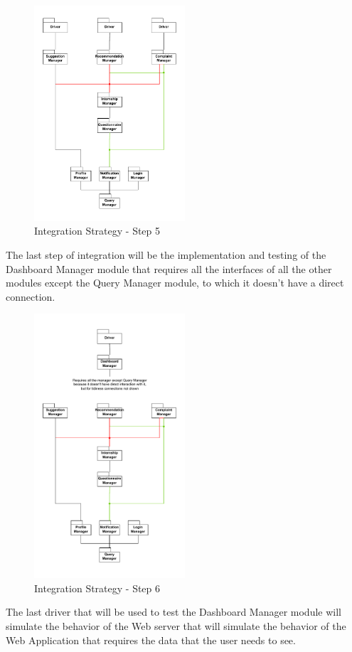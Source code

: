 \begin{figure}[H]
    \centering
    \includegraphics[width=0.5\textwidth]{Images/Integ_5.pdf}
    \caption{Integration Strategy - Step 5}
    \label{fig:integration-strategy-step-5}
\end{figure}

\par The last step of integration will be the implementation and testing of the Dashboard Manager module that requires
all the interfaces of all the other modules except the Query Manager module, to which it doesn't have a direct connection.

\begin{figure}[H]
    \centering
    \includegraphics[width=0.5\textwidth]{Images/Integ_6.pdf}
    \caption{Integration Strategy - Step 6}
    \label{fig:integration-strategy-step-6}
\end{figure}

\par The last driver that will be used to test the Dashboard Manager module will simulate the behavior of the Web server
that will simulate the behavior of the Web Application that requires the data that the user needs to see.
